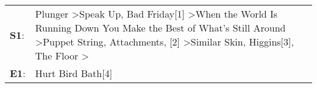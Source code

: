 \begin{supertabular}{p{0.03\textwidth}p{0.92\textwidth}}
 \textbf{S1}:  &  Plunger\textsuperscript{} \textgreater \enspace Speak Up\textsuperscript{}, \enspace Bad Friday[1]\textsuperscript{} \textgreater \enspace When the World Is Running Down You Make the Best of What's Still Around\textsuperscript{} \textgreater \enspace Puppet String\textsuperscript{}, \enspace Attachments\textsuperscript{}, [2]\textsuperscript{} \textgreater \enspace Similar Skin\textsuperscript{}, \enspace Higgins[3]\textsuperscript{}, \enspace The Floor\textsuperscript{} \textgreater {}\textsuperscript{}  \enspace  \\
 \textbf{E1}:  &                                                                                                                                                                                                                                                                                                                                                                                                                                                                                                                    Hurt Bird Bath[4]\textsuperscript{}  \enspace  \\
\end{supertabular}

